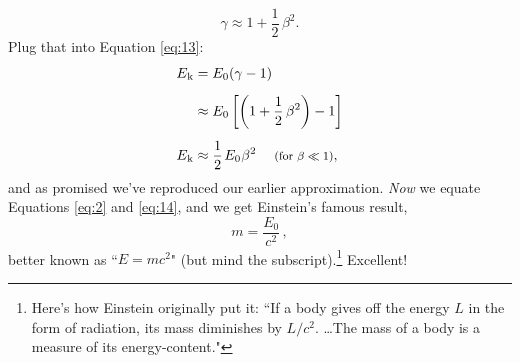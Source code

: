 \documentclass[12pt]{article}
\begin{document}
\begin{equation*}
\gamma \approx 1 + \dfrac{1}{2}\,\beta^2.
\end{equation*}
Plug that into Equation \ref{eq:13}:
\begin{equation}\label{eq:14}
\begin{split}
E_{\mkern.5mu \textrm{k}} &=E_0 (\gamma - 1)\\[5pt]
&\approx E_0 \left[ \left( 1 + \dfrac{1}{2}\,\beta^2 \right) -1 \right] \\[5pt]
E_{\mkern.5mu \textrm{k}} &\approx \frac{1}{2} \mkern2mu E_0 \mkern.5mu \beta^2 \quad \textrm{\footnotesize{ (for $\beta \ll 1$)}},
\end{split}
\end{equation}
and as promised we've reproduced our earlier approximation. \emph{Now} we equate Equations \ref{eq:2} and \ref{eq:14}, and we get Einstein's famous result,
\begin{equation}\label{eq:15}
\boxed{m = \frac{E_0}{c^2}} \, ,
\end{equation}
better known as ``$E = mc^2$" (but mind the subscript).\footnote{Here's how Einstein originally put it: ``If a body gives off the energy $L$ in the form of radiation, its mass diminishes by $L / c^2$. \ldots The mass of a body is a measure of its energy-content."} Excellent!
\end{document}
